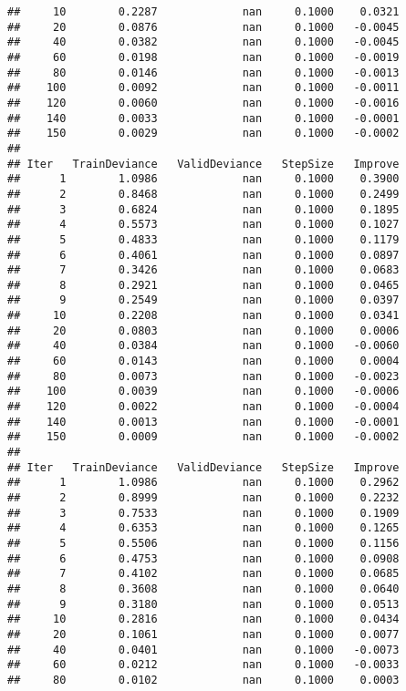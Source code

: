 \documentclass[
]{article}
\begin{document}
\begin{verbatim}
##     10        0.2287             nan     0.1000    0.0321
##     20        0.0876             nan     0.1000   -0.0045
##     40        0.0382             nan     0.1000   -0.0045
##     60        0.0198             nan     0.1000   -0.0019
##     80        0.0146             nan     0.1000   -0.0013
##    100        0.0092             nan     0.1000   -0.0011
##    120        0.0060             nan     0.1000   -0.0016
##    140        0.0033             nan     0.1000   -0.0001
##    150        0.0029             nan     0.1000   -0.0002
## 
## Iter   TrainDeviance   ValidDeviance   StepSize   Improve
##      1        1.0986             nan     0.1000    0.3900
##      2        0.8468             nan     0.1000    0.2499
##      3        0.6824             nan     0.1000    0.1895
##      4        0.5573             nan     0.1000    0.1027
##      5        0.4833             nan     0.1000    0.1179
##      6        0.4061             nan     0.1000    0.0897
##      7        0.3426             nan     0.1000    0.0683
##      8        0.2921             nan     0.1000    0.0465
##      9        0.2549             nan     0.1000    0.0397
##     10        0.2208             nan     0.1000    0.0341
##     20        0.0803             nan     0.1000    0.0006
##     40        0.0384             nan     0.1000   -0.0060
##     60        0.0143             nan     0.1000    0.0004
##     80        0.0073             nan     0.1000   -0.0023
##    100        0.0039             nan     0.1000   -0.0006
##    120        0.0022             nan     0.1000   -0.0004
##    140        0.0013             nan     0.1000   -0.0001
##    150        0.0009             nan     0.1000   -0.0002
## 
## Iter   TrainDeviance   ValidDeviance   StepSize   Improve
##      1        1.0986             nan     0.1000    0.2962
##      2        0.8999             nan     0.1000    0.2232
##      3        0.7533             nan     0.1000    0.1909
##      4        0.6353             nan     0.1000    0.1265
##      5        0.5506             nan     0.1000    0.1156
##      6        0.4753             nan     0.1000    0.0908
##      7        0.4102             nan     0.1000    0.0685
##      8        0.3608             nan     0.1000    0.0640
##      9        0.3180             nan     0.1000    0.0513
##     10        0.2816             nan     0.1000    0.0434
##     20        0.1061             nan     0.1000    0.0077
##     40        0.0401             nan     0.1000   -0.0073
##     60        0.0212             nan     0.1000   -0.0033
##     80        0.0102             nan     0.1000    0.0003

\end{verbatim}
\end{document}
